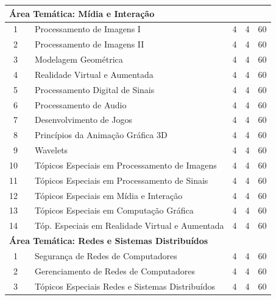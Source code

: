 \documentclass[
	12pt,				%
	openright,			%
  oneside,     %
	a4paper,			%
	english,			%
	french,				%
	spanish,			%
	brazil				%
	]{abntex2}
\begin{document}
\begin{apendicesenv}
\begin{longtable}{r|r|l|r|r|r}
\multicolumn{6}{l}{\textbf{Área Temática: Mídia e Interação}} \\ \hline
    1     &       & Processamento de Imagens I & 4     & 4     & 60 \\ \hline
    2     &       & Processamento de Imagens II & 4     & 4     & 60 \\ \hline
    3     &       & Modelagem Geométrica & 4     & 4     & 60 \\ \hline 
    4     &       & Realidade Virtual e Aumentada & 4     & 4     & 60 \\ \hline 
    5     &       & Processamento Digital de Sinais & 4     & 4     & 60 \\ \hline
    6     &       & Processamento de Audio & 4     & 4     & 60 \\ \hline
    7     &       & Desenvolvimento de Jogos & 4     & 4     & 60 \\ \hline
    8     &       & Princípios da Animação Gráfica 3D & 4     & 4     & 60 \\ \hline
    9     &       & Wavelets & 4     & 4     & 60 \\ \hline
   10     &       & \small{Tópicos Especiais em Processamento de Imagens} & 4     & 4     & 60 \\ \hline
   11     &       & \small{Tópicos Especiais em Processamento de Sinais} & 4     & 4     & 60 \\ \hline
   12     &       & \small{Tópicos Especiais em Mídia e Interação} & 4     & 4     & 60 \\ \hline
   13     &       & \small{Tópicos Especiais em Computação Gráfica} & 4     & 4     & 60 \\ \hline
   14     &       & \small{Tóp. Especiais em Realidade Virtual e Aumentada} & 4     & 4     & 60 \\ \hline

\multicolumn{6}{l}{\textbf{Área Temática: Redes e Sistemas Distribuídos}} \\ \hline
    1     &       & Segurança de Redes de Computadores & 4     & 4     & 60 \\ \hline
    2     &       & Gerenciamento de Redes de Computadores & 4     & 4     & 60 \\ \hline
    3     &       & \small{Tópicos Especiais Redes e Sistemas Distribuídos} & 4     & 4     & 60 \\ \hline


\end{longtable}
\end{apendicesenv}
\end{document}

